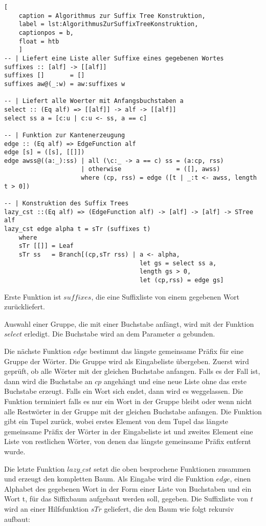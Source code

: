 \documentclass[12pt]{report}
\begin{document}
\begin{lstlisting}[
    caption = Algorithmus zur Suffix Tree Konstruktion,
    label = lst:AlgorithmusZurSuffixTreeKonstruktion,
    captionpos = b,
    float = htb
    ]
-- | Liefert eine Liste aller Suffixe eines gegebenen Wortes
suffixes :: [alf] -> [[alf]]
suffixes []       = []
suffixes aw@(_:w) = aw:suffixes w

-- | Liefert alle Woerter mit Anfangsbuchstaben a
select :: (Eq alf) => [[alf]] -> alf -> [[alf]]
select ss a = [c:u | c:u <- ss, a == c]

-- | Funktion zur Kantenerzeugung
edge :: (Eq alf) => EdgeFunction alf
edge [s] = ([s], [[]])
edge awss@((a:_):ss) | all (\c:_ -> a == c) ss = (a:cp, rss)
                     | otherwise               = ([], awss)
                     where (cp, rss) = edge ([t | _:t <- awss, length t > 0])

-- | Konstruktion des Suffix Trees
lazy_cst ::(Eq alf) => (EdgeFunction alf) -> [alf] -> [alf] -> STree alf
lazy_cst edge alpha t = sTr (suffixes t)
    where
    sTr [[]] = Leaf
    sTr ss   = Branch[(cp,sTr rss) | a <- alpha,
                                     let gs = select ss a,
                                     length gs > 0,
                                     let (cp,rss) = edge gs]
\end{lstlisting}

Erste Funktion ist $suffixes$, die eine Suffixliste von einem gegebenen Wort zurückliefert.

Auswahl einer Gruppe, die mit einer Buchstabe anfängt, wird mit der Funktion $select$ erledigt. Die Buchstabe wird an dem Parameter $a$ gebunden.

Die nächste Funktion $edge$ bestimmt das längste gemeinsame Präfix für eine Gruppe der Wörter. Die Gruppe wird als Eingabeliste übergeben. Zuerst wird geprüft, ob alle Wörter mit der gleichen Buchstabe anfangen. Falls es der Fall ist, dann wird die Buchstabe an $cp$ angehängt und eine neue Liste ohne das erste Buchstabe erzeugt. Falls ein Wort sich endet, dann wird es weggelassen. Die Funktion terminiert falls es nur ein Wort in der Gruppe bleibt oder wenn nicht alle Restwörter in der Gruppe mit der gleichen Buchstabe anfangen. Die Funktion gibt ein Tupel zurück, wobei erstes Element von dem Tupel das längste gemeinsame Präfix der Wörter in der Eingabeliste ist und zweites Element eine Liste von restlichen Wörter, von denen das längste gemeinsame Präfix entfernt wurde.

Die letzte Funktion $lazy\_cst$ setzt die oben besprochene Funktionen zusammen und erzeugt den kompletten Baum. Als Eingabe wird die Funktion $edge$, einen Alphabet des gegebenen Wort in der Form einer Liste von Buchstaben und ein Wort t, für das Siffixbaum aufgebaut werden soll, gegeben. Die Suffixliste von $t$ wird an einer Hilfsfunktion $sTr$ geliefert, die den Baum wie folgt rekursiv aufbaut:
\end{document}
